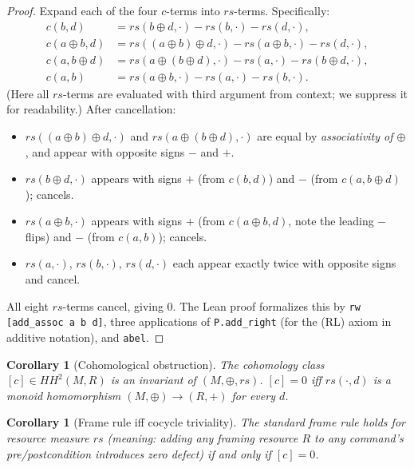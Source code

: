 \documentclass[acmsmall,sigplan,anonymous,review,screen]{acmart}
\theoremstyle{plain}
\newtheorem{corollary}[theorem]{Corollary}
\theoremstyle{definition}
\newcommand{\rs}{\mathit{rs}}
\newcommand{\HH}[2]{H\!H^{#1}(#2)}
\newcommand{\lean}[1]{\texttt{#1}}
\begin{document}
\begin{proof}
  Expand each of the four $c$-terms into $\rs$-terms.  Specifically:
  \begin{align*}
    c(b, d) &= \rs(b \oplus d, \cdot) - \rs(b, \cdot) - \rs(d, \cdot), \\
    c(a \oplus b, d) &= \rs((a \oplus b) \oplus d, \cdot) - \rs(a \oplus b, \cdot) - \rs(d, \cdot), \\
    c(a, b \oplus d) &= \rs(a \oplus (b \oplus d), \cdot) - \rs(a, \cdot) - \rs(b \oplus d, \cdot), \\
    c(a, b) &= \rs(a \oplus b, \cdot) - \rs(a, \cdot) - \rs(b, \cdot).
  \end{align*}
  (Here all $\rs$-terms are evaluated with third argument from context;
  we suppress it for readability.)
  After cancellation:
  \begin{itemize}[itemsep=1pt]
    \item $\rs((a \oplus b) \oplus d, \cdot)$ and $\rs(a \oplus (b \oplus d), \cdot)$
      are equal by \emph{associativity of $\oplus$}, and appear with
      opposite signs $-$ and $+$.
    \item $\rs(b \oplus d, \cdot)$ appears with signs $+$ (from $c(b,d)$)
      and $-$ (from $c(a, b \oplus d)$); cancels.
    \item $\rs(a \oplus b, \cdot)$ appears with signs $+$ (from $c(a \oplus b, d)$,
      note the leading $-$ flips) and $-$ (from $c(a, b)$); cancels.
    \item $\rs(a, \cdot)$, $\rs(b, \cdot)$, $\rs(d, \cdot)$ each appear
      exactly twice with opposite signs and cancel.
  \end{itemize}
  All eight $\rs$-terms cancel, giving 0.  The Lean proof formalizes this
  by \lean{rw [add\_assoc a b d]}, three applications of
  \lean{P.add\_right} (for the (RL) axiom in additive notation), and
  \lean{abel}.
\end{proof}

\begin{corollary}[Cohomological obstruction]
\label{cor:coh}
  The cohomology class $[c] \in \HH{2}{M, R}$ is an invariant of
  $(M, \oplus, \rs)$.  $[c] = 0$ iff $\rs(\cdot, d)$ is a monoid
  homomorphism $(M, \oplus) \to (R, +)$ for every $d$.
\end{corollary}

\begin{corollary}[Frame rule iff cocycle triviality]
\label{cor:frame-iff-cocycle}
  The standard frame rule holds for resource measure $\rs$ (meaning:
  adding any framing resource $R$ to any command's pre/postcondition
  introduces zero defect) if and only if $[c] = 0$.
\end{corollary}
\end{document}

